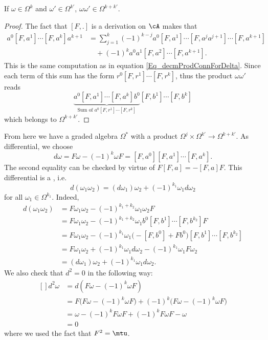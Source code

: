 \begin{lemma}
If $\omega\in\Omega^k$ and $\omega'\in\Omega^{k'}$, $\omega\omega'\in\Omega^{k+k'}$.
\end{lemma}

\begin{proof}
The fact that $[F,.]$ is a derivation on $\cA$ makes that
\[
\begin{split}
  a^0[F,a^1]\cdots[F,a^{k}]a^{k+1}&=\sum_{j=1}^{k}(-1)^{k-j}a^0[F,a^1]\cdots[F,a^{j}a^{j+1}]\cdots[F,a^{k+1}]\\
					&\quad+(-1)^ka^0a^1[F,a^2]\cdots[F,a^{k+1}].
\end{split}
\]
This is the same computation as in equation \eqref{Eq_decmProdConnForDelta}. Since each term of this sum has the form $r^0[F,r^1]\cdots[F,r^k]$, thus the product $\omega\omega'$ reads
\[
  \underbrace{a^0[F,a^1]\cdots[F,a^{k}]b^0}_{\textrm{Sum of }a^0[F,r^1]\cdots[F,r^k]}[F,b^1]\cdots[F,b^k]
\]
which belongs to $\Omega^{k+k'}$.
\end{proof}
From here we have a graded algebra $\Omega^*$ with a product $\Omega^j\times\Omega^{k'}\to\Omega^{k+k'}$. As differential, we choose
\begin{equation}  \label{EqFreddDefbel}
d\omega=F\omega-(-1)^k\omega F=[F,a^0][F,a^1]\cdots[F,a^{k}].
\end{equation}
The second equality can be checked by virtue of $F[F,a]=-[F,a]F$. This differential is a , i.e.
\begin{equation}
  d(\omega_1\omega_2)=(d\omega_1)\omega_2+(-1)^{k_1}\omega_1d\omega_2
\end{equation}
for all $\omega_1\in\Omega^{k_1}$. Indeed,
\[
\begin{split}
d(\omega_1\omega_2)&=F\omega_1\omega_2-(-1)^{k_1+k_2}\omega_1\omega_2 F\\
		&=F\omega_1\omega_2-(-1)^{k_1+k_2}\omega_1b^0[F,b^1]\cdots[F,b^{k_2}]F\\
		&=F\omega_1\omega_2-(-1)^{k_1}\omega_1\big( -[F,b^0]+Fb^0 \big)[F,b^1]\cdots[F,b^{k_2}]\\
		&=F\omega_1\omega_2+(-1)^{k_1}\omega_1d\omega_2-(-1)^{k_1}\omega_1 F\omega_2\\
		&=(d\omega_1)\omega_2+(-1)^{k_1}\omega_1 d\omega_2.
\end{split}
\]
We also check that $d^2=0$ in the following way:
\begin{equation}
	\begin{aligned}[]
		d^2\omega&=d(F\omega-(-1)^k\omega F)\\
		&=F\big( F\omega-(-1)^k\omega F \big)+(-1)^{k}\big( F\omega-(-1)^k\omega F \big)\\
		&=\omega-(-1)^kF\omega F+(-1)^k F\omega F-\omega\\
		&=0
	\end{aligned}
\end{equation}
where we used the fact that $F^2=\mtu$.

